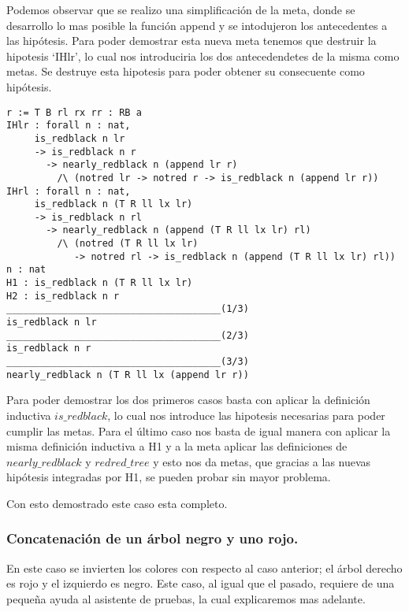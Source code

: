 Podemos observar que se realizo una simplificaci\'on de la meta, donde se desarrollo lo mas
posible la funci\'on append y se intodujeron los antecedentes a las hip\'otesis. Para poder
demostrar esta nueva meta tenemos que destruir la hipotesis `IHlr', lo cual nos introduciria los
dos antecedendetes de la misma como metas. Se destruye esta hipotesis para poder obtener su consecuente como hip\'otesis.

\begin{verbatim}
r := T B rl rx rr : RB a
IHlr : forall n : nat,
     is_redblack n lr
     -> is_redblack n r
       -> nearly_redblack n (append lr r)
         /\ (notred lr -> notred r -> is_redblack n (append lr r))
IHrl : forall n : nat,
     is_redblack n (T R ll lx lr)
     -> is_redblack n rl
       -> nearly_redblack n (append (T R ll lx lr) rl)
         /\ (notred (T R ll lx lr)
            -> notred rl -> is_redblack n (append (T R ll lx lr) rl))
n : nat
H1 : is_redblack n (T R ll lx lr)
H2 : is_redblack n r
______________________________________(1/3)
is_redblack n lr
______________________________________(2/3)
is_redblack n r
______________________________________(3/3)
nearly_redblack n (T R ll lx (append lr r))
\end{verbatim}

Para poder demostrar los dos primeros casos basta con aplicar la definici\'on inductiva
$is\_redblack$, lo cual nos introduce las hipotesis necesarias para poder cumplir las metas.
Para el \'ultimo caso nos basta de igual manera con aplicar la misma definici\'on inductiva a H1 y
a la meta aplicar las definiciones de $nearly\_redblack$ y $redred\_tree$ y esto nos da metas, que
gracias a las nuevas hip\'otesis integradas por H1, se pueden probar sin mayor problema.

Con esto demostrado este caso esta completo.

\subsubsection{Concatenaci\'on de un \'arbol negro y uno rojo.}

En este caso se invierten los colores con respecto al caso anterior; el \'arbol derecho es rojo y
el izquierdo es negro. Este caso, al igual que el pasado, requiere de una pequeña ayuda al
asistente de pruebas, la cual explicaremos mas adelante.

